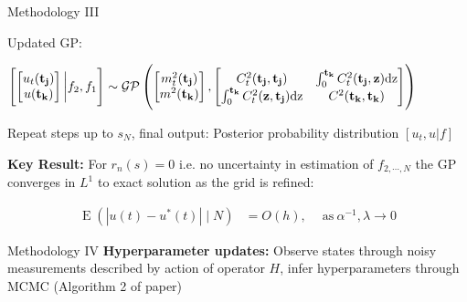 \documentclass[usenames,dvipsnames]{beamer}
\theoremstyle{definition}
\begin{document}
\begin{frame}{Methodology III}

Updated GP:

$\left [ \begin{bmatrix}u_t(\mathbf{t_j})\\u(\mathbf{t_k})\end{bmatrix} \bigg{\vert} f_2, f_1 \right ]\sim\mathcal{GP}\left (\begin{bmatrix}m_t^2(\mathbf{t_j})\\m^2(\mathbf{t_k})\end{bmatrix},\begin{bmatrix}C_t^2(\mathbf{t_j},\mathbf{t_j})&\int_0^{\mathbf{t_k}}C_t^2(\mathbf{t_j},\mathbf{z})\mathrm{dz}\\ \int_0^{\mathbf{t_k}}C_t^2(\mathbf{z},\mathbf{t_j})\mathrm{dz}&C^2(\mathbf{t_k},\mathbf{t_k})\end{bmatrix} \right )$


Repeat steps up to $s_N$, final output: Posterior probability distribution $[u_t, u | f]$

\textbf{Key Result: } For $r_n(s)=0$ i.e. no uncertainty in estimation of $f_{2, \cdots, N}$ the GP converges in $L^1$ to exact solution as the grid is refined:

$$\begin{aligned}\operatorname{E}\left(|u(t)-u^*(t)|\mid N\right)&=O(h),\quad\mathrm{~as~}\alpha^{-1},\lambda\to0\end{aligned}$$

\end{frame}


\begin{frame}{Methodology IV}
\textbf{Hyperparameter updates:}
Observe states through noisy measurements described by action of operator $H$, infer hyperparameters through MCMC (Algorithm 2 of paper)

\end{frame}
\end{document}
